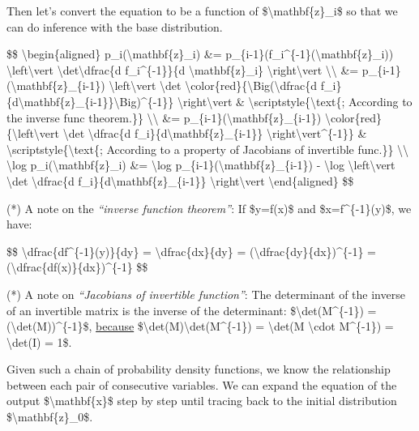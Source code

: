 Then let's convert the equation to be a function of \$\textbackslash mathbf\{z\}\_i\$ so that we can do inference with the base distribution.

\$\$ \textbackslash begin\{aligned\} p\_i(\textbackslash mathbf\{z\}\_i) \&= p\_\{i-1\}(f\_i\^{}\{-1\}(\textbackslash mathbf\{z\}\_i)) \textbackslash left\textbackslash vert \textbackslash det\textbackslash dfrac\{d f\_i\^{}\{-1\}\}\{d \textbackslash mathbf\{z\}\_i\} \textbackslash right\textbackslash vert \textbackslash\textbackslash{} \&= p\_\{i-1\}(\textbackslash mathbf\{z\}\_\{i-1\}) \textbackslash left\textbackslash vert \textbackslash det \textbackslash color\{red\}\{\textbackslash Big(\textbackslash dfrac\{d f\_i\}\{d\textbackslash mathbf\{z\}\_\{i-1\}\}\textbackslash Big)\^{}\{-1\}\} \textbackslash right\textbackslash vert \& \textbackslash scriptstyle\{\textbackslash text\{; According to the inverse func theorem.\}\} \textbackslash\textbackslash{} \&= p\_\{i-1\}(\textbackslash mathbf\{z\}\_\{i-1\}) \textbackslash color\{red\}\{\textbackslash left\textbackslash vert \textbackslash det \textbackslash dfrac\{d f\_i\}\{d\textbackslash mathbf\{z\}\_\{i-1\}\} \textbackslash right\textbackslash vert\^{}\{-1\}\} \& \textbackslash scriptstyle\{\textbackslash text\{; According to a property of Jacobians of invertible func.\}\} \textbackslash\textbackslash{} \textbackslash log p\_i(\textbackslash mathbf\{z\}\_i) \&= \textbackslash log p\_\{i-1\}(\textbackslash mathbf\{z\}\_\{i-1\}) - \textbackslash log \textbackslash left\textbackslash vert \textbackslash det \textbackslash dfrac\{d f\_i\}\{d\textbackslash mathbf\{z\}\_\{i-1\}\} \textbackslash right\textbackslash vert \textbackslash end\{aligned\} \$\$

(*) A note on the \emph{``inverse function theorem''}: If \$y=f(x)\$ and \$x=f\^{}\{-1\}(y)\$, we have:

\$\$ \textbackslash dfrac\{df\^{}\{-1\}(y)\}\{dy\} = \textbackslash dfrac\{dx\}\{dy\} = (\textbackslash dfrac\{dy\}\{dx\})\^{}\{-1\} = (\textbackslash dfrac\{df(x)\}\{dx\})\^{}\{-1\} \$\$

(*) A note on \emph{``Jacobians of invertible function''}: The determinant of the inverse of an invertible matrix is the inverse of the determinant: \$\textbackslash det(M\^{}\{-1\}) = (\textbackslash det(M))\^{}\{-1\}\$, \hyperref[jacobian-matrix-and-determinant]{because} \$\textbackslash det(M)\textbackslash det(M\^{}\{-1\}) = \textbackslash det(M \textbackslash cdot M\^{}\{-1\}) = \textbackslash det(I) = 1\$.

Given such a chain of probability density functions, we know the relationship between each pair of consecutive variables. We can expand the equation of the output \$\textbackslash mathbf\{x\}\$ step by step until tracing back to the initial distribution \$\textbackslash mathbf\{z\}\_0\$.

